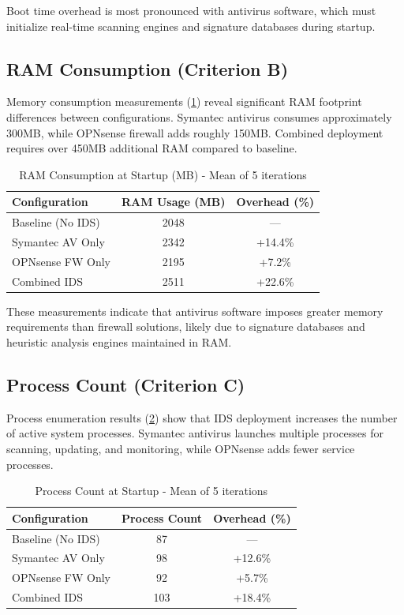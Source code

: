 \documentclass[runningheads,a4paper,english]{llncs}[2022/01/12]
\begin{document}
Boot time overhead is most pronounced with antivirus software, which must initialize real-time scanning engines and signature databases during startup.

\subsection{RAM Consumption (Criterion B)}

Memory consumption measurements (\cref{tab:ram}) reveal significant RAM footprint differences between configurations. Symantec antivirus consumes approximately 300MB, while OPNsense firewall adds roughly 150MB. Combined deployment requires over 450MB additional RAM compared to baseline.

\begin{table}
  \caption{RAM Consumption at Startup (MB) - Mean of 5 iterations}
  \label{tab:ram}
  \centering
  \begin{tabular}{lcc}
    \toprule
    Configuration & RAM Usage (MB) & Overhead (\%) \\
    \midrule
    Baseline (No IDS) & 2048 & --- \\
    Symantec AV Only & 2342 & +14.4\% \\
    OPNsense FW Only & 2195 & +7.2\% \\
    Combined IDS & 2511 & +22.6\% \\
    \bottomrule
  \end{tabular}
\end{table}

These measurements indicate that antivirus software imposes greater memory requirements than firewall solutions, likely due to signature databases and heuristic analysis engines maintained in RAM.

\subsection{Process Count (Criterion C)}

Process enumeration results (\cref{tab:processes}) show that IDS deployment increases the number of active system processes. Symantec antivirus launches multiple processes for scanning, updating, and monitoring, while OPNsense adds fewer service processes.

\begin{table}
  \caption{Process Count at Startup - Mean of 5 iterations}
  \label{tab:processes}
  \centering
  \begin{tabular}{lcc}
    \toprule
    Configuration & Process Count & Overhead (\%) \\
    \midrule
    Baseline (No IDS) & 87 & --- \\
    Symantec AV Only & 98 & +12.6\% \\
    OPNsense FW Only & 92 & +5.7\% \\
    Combined IDS & 103 & +18.4\% \\
    \bottomrule
  \end{tabular}
\end{table}
\end{document}
